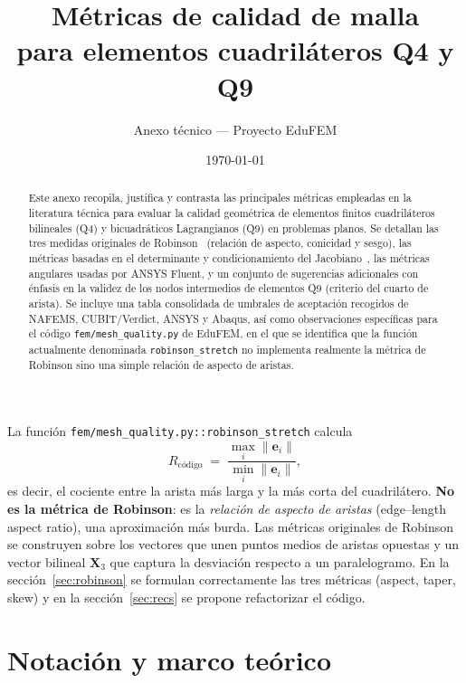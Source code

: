 \documentclass[11pt,a4paper]{article}
\title{\bfseries M\'etricas de calidad de malla\\para elementos cuadril\'ateros Q4 y Q9}
\author{Anexo t\'ecnico --- Proyecto EduFEM}
\date{\today}
\begin{document}
\maketitle

\begin{abstract}
\noindent
Este anexo recopila, justifica y contrasta las principales m\'etricas empleadas en la literatura t\'ecnica para evaluar la calidad geom\'etrica de elementos finitos cuadril\'ateros bilineales (Q4) y bicuadr\'aticos Lagrangianos (Q9) en problemas planos. Se detallan las tres medidas originales de Robinson~\cite{Robinson1987} (relaci\'on de aspecto, conicidad y sesgo), las m\'etricas basadas en el determinante y condicionamiento del Jacobiano~\cite{Knupp2000,Knupp2003}, las m\'etricas angulares usadas por ANSYS Fluent, y un conjunto de sugerencias adicionales con \'enfasis en la validez de los nodos intermedios de elementos Q9 (criterio del cuarto de arista). Se incluye una tabla consolidada de umbrales de aceptaci\'on recogidos de NAFEMS, CUBIT/Verdict, ANSYS y Abaqus, as\'i como observaciones espec\'ificas para el c\'odigo \texttt{fem/mesh\_quality.py} de EduFEM, en el que se identifica que la funci\'on actualmente denominada \texttt{robinson\_stretch} no implementa realmente la m\'etrica de Robinson sino una simple relaci\'on de aspecto de aristas.
\end{abstract}

\tableofcontents
\vspace{1em}

\begin{bugbox}[title={Hallazgo principal}]
La funci\'on \texttt{fem/mesh\_quality.py::robinson\_stretch} calcula
\[
R_{\text{c\'odigo}} \;=\; \frac{\max_i \|\mathbf{e}_i\|}{\min_i \|\mathbf{e}_i\|},
\]
es decir, el cociente entre la arista m\'as larga y la m\'as corta del cuadril\'atero. \textbf{No es la m\'etrica de Robinson}: es la \emph{relaci\'on de aspecto de aristas} (edge--length aspect ratio), una aproximaci\'on m\'as burda. Las m\'etricas originales de Robinson~\cite{Robinson1987} se construyen sobre los vectores que unen puntos medios de aristas opuestas y un vector bilineal $\mathbf{X}_3$ que captura la desviaci\'on respecto a un paralelogramo. En la secci\'on~\ref{sec:robinson} se formulan correctamente las tres m\'etricas (aspect, taper, skew) y en la secci\'on~\ref{sec:recs} se propone refactorizar el c\'odigo.
\end{bugbox}

\section{Notaci\'on y marco te\'orico}
\end{document}
